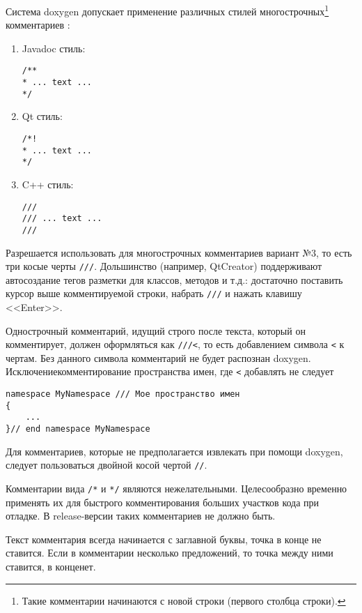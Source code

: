 Система doxygen допускает применение различных стилей многострочных\footnote{Такие комментарии начинаются с новой строки (первого столбца строки).} комментариев \cite{DoxygenКомментарии}:
\begin{enumerate}
\item Javadoc стиль:
\begin{lstlisting}[frame=single]
/**
* ... text ...
*/
\end{lstlisting}
\item Qt стиль:
\begin{lstlisting}[frame=single]
/*!
* ... text ...
*/
\end{lstlisting}
\item C++ стиль:
\begin{lstlisting}[frame=single]
///
/// ... text ...
///
\end{lstlisting}
\end{enumerate}

Разрешается использовать для многострочных комментариев вариант №3, то есть три косые черты \lstinline|///|.
Дольшинство  (например, QtCreator) поддерживают автосоздание тегов разметки для классов, методов и т.д.: достаточно поставить курсор выше комментируемой строки, набрать \lstinline|///| и нажать клавишу <<Enter>>.

Однострочный комментарий, идущий строго после текста, который он комментирует, должен оформляться как \lstinline|///<|, то есть добавлением символа \lstinline|<| к чертам. Без данного символа комментарий не будет распознан doxygen. Исключение\mdash комментирование пространства имен, где \lstinline|<| добавлять не следует

\begin{lstlisting}[frame=single]
namespace MyNamespace /// Мое пространство имен
{
    ...
}// end namespace MyNamespace
\end{lstlisting}

Для комментариев, которые не предполагается извлекать при помощи doxygen, следует пользоваться двойной косой чертой \lstinline|//|.

Комментарии вида \lstinline|/*| и \lstinline|*/| являются нежелательными. Целесообразно временно применять их для быстрого комментирования больших участков кода при отладке. В release-версии таких комментариев не должно быть. 

Текст комментария всегда начинается с заглавной буквы, точка в конце не ставится. Если в комментарии несколько предложений, то точка между ними ставится, в конце\mdash нет.

